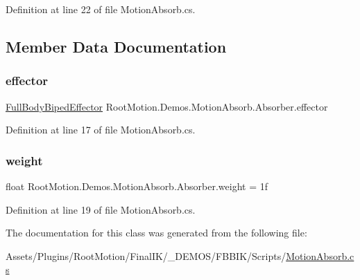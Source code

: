 Definition at line 22 of file Motion\+Absorb.\+cs.



\subsection{Member Data Documentation}
\mbox{\label{class_root_motion_1_1_demos_1_1_motion_absorb_1_1_absorber_a60ae6699ece055fff8e18c5a846bfade}} 
\subsubsection{\texorpdfstring{effector}{effector}}
{\footnotesize\ttfamily \mbox{\hyperlink{namespace_root_motion_1_1_final_i_k_ae0dd2058c7667b6f132c11a6b860c14a}{Full\+Body\+Biped\+Effector}} Root\+Motion.\+Demos.\+Motion\+Absorb.\+Absorber.\+effector}



Definition at line 17 of file Motion\+Absorb.\+cs.

\mbox{\label{class_root_motion_1_1_demos_1_1_motion_absorb_1_1_absorber_ae55c2d0275c1982b873b1a0c4725a783}} 
\subsubsection{\texorpdfstring{weight}{weight}}
{\footnotesize\ttfamily float Root\+Motion.\+Demos.\+Motion\+Absorb.\+Absorber.\+weight = 1f}



Definition at line 19 of file Motion\+Absorb.\+cs.



The documentation for this class was generated from the following file\+:\begin{DoxyCompactItemize}
\item 
Assets/\+Plugins/\+Root\+Motion/\+Final\+I\+K/\+\_\+\+D\+E\+M\+O\+S/\+F\+B\+B\+I\+K/\+Scripts/\mbox{\hyperlink{_motion_absorb_8cs}{Motion\+Absorb.\+cs}}\end{DoxyCompactItemize}
